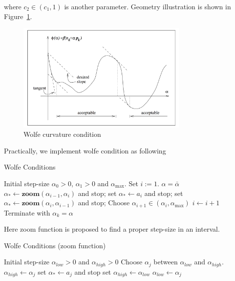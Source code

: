 \documentclass[11pt]{report}
\begin{document}
 where $c_2\in (c_1,1)$ is another parameter. Geometry illustration is shown in Figure~\ref{fig:Wolfe_curvature}.
\begin{figure}[H]
    \centering
    \includegraphics[width=0.75\textwidth]{../images/wolfe2}
    \caption{Wolfe curvature condition}
    \label{fig:Wolfe_curvature}
\end{figure}

Practically, we implement wolfe condition as following
\begin{algorithm}[H]
\caption{Wolfe Conditions}
\label{alg:Wolfe Conditions}
\begin{algorithmic}[1]
\REQUIRE Initial step-size $\alpha_0 >0$, $\alpha_1 >0$ and $\alpha_{\max}$. Set $i:= 1$. 
\STATE $\alpha = \bar{\alpha}$
\REPEAT
    \STATE $\alpha_*  \leftarrow \mathbf{zoom}(\alpha_{i-1},\alpha_i)$ and stop;
    \ENDIF
    \STATE set $\alpha_* \leftarrow a_i$ and stop;
    \ENDIF
    \STATE set $\alpha_* \leftarrow \mathbf{zoom}(\alpha_i,\alpha_{i-1})$ and stop;
    \ENDIF
    \STATE Choose $\alpha_{i+1} \in (\alpha_i,\alpha_{\max})$
    \STATE $i \leftarrow i+1$
\UNTIL{}
\STATE Terminate with $\alpha_k = \alpha$
\end{algorithmic}
\end{algorithm}

Here zoom function is proposed to find a proper step-size in an interval.
\begin{algorithm}[H]
\caption{Wolfe Conditions (zoom function)}
\label{alg:Wolfe Conditions zoom function}
\begin{algorithmic}[1]
\REQUIRE Initial step-size $\alpha_{low} >0$ and $\alpha_{high} >0$ 
\REPEAT
\STATE Choose $\alpha_j$ between $\alpha_{low}$ and $\alpha_{high}$.
    \STATE $\alpha_{high}\leftarrow \alpha_j$
    \ELSE
    \STATE set $\alpha_* \leftarrow a_j$ and stop
    \ENDIF
    \STATE set $\alpha_{high} \leftarrow \alpha_{low}$
    \ENDIF
    \STATE $\alpha_{low} \leftarrow \alpha_j$
    \ENDIF
\UNTIL{}
\end{algorithmic}
\end{algorithm}
\end{document}
